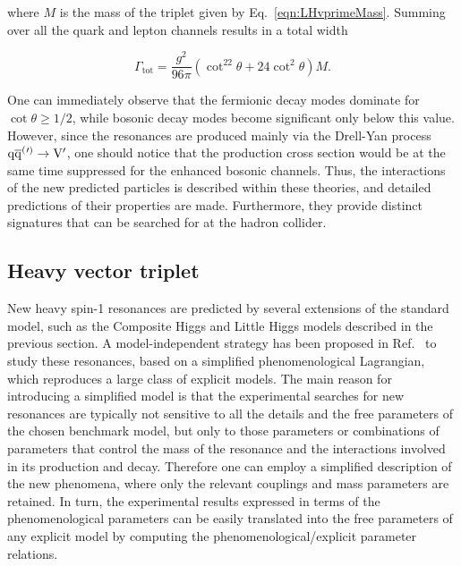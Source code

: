 \noindent where $M$ is the mass of the \PVpr triplet given by Eq.~\ref{eqn:LHvprimeMass}.
Summing over all the quark and lepton channels results in a total width

\begin{equation}\label{eqn:LHvprimeWidth}
\Gamma_\mathrm{tot} = \frac{g^2}{96\pi}(\cot^22\theta + 24\cot^2\theta)M.
\end{equation}

One can immediately observe that the fermionic decay modes dominate for $\cot\theta \geq 1/2$, while bosonic decay modes become significant only below this value.
However, since the \PVpr resonances are produced mainly via the Drell-Yan process $\mathrm{q}\overline{\mathrm{q}}^({}'^){} \to \mathrm{V}^\prime$, one should notice that the production cross section would be at the same time suppressed for the enhanced bosonic channels.
Thus, the interactions of the new predicted particles is described within these theories, and detailed predictions of their properties are made.
Furthermore, they provide distinct signatures that can be searched for at the hadron collider.

\subsection{Heavy vector triplet}\label{subsec:hvt}

New heavy spin-1 resonances are predicted by several extensions of the standard model, such as the Composite Higgs and Little Higgs models described in the previous section.
A model-independent strategy has been proposed in Ref.~\cite{Pappadopulo:2014qza} to study these resonances, based on a simplified phenomenological Lagrangian, which reproduces a large class of explicit models.
The main reason for introducing a simplified model is that the experimental searches for new resonances are typically not sensitive to all the details and the free parameters of the chosen benchmark model, but only to those parameters or combinations of parameters that control the mass of the resonance and the interactions involved in its production and decay. Therefore one can employ a simplified description of the new phenomena, where only the relevant couplings and mass parameters are retained. In turn, the experimental results expressed in terms of the phenomenological parameters can be easily translated into the free parameters of any explicit model by computing the phenomenological/explicit parameter relations.\\

